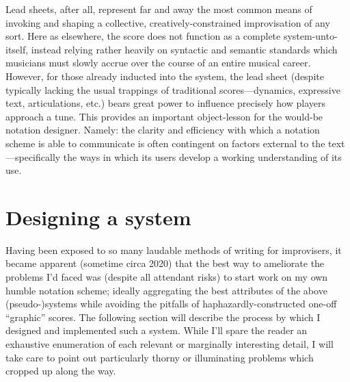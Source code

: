      Lead sheets, after all, represent far and away the most common means of invoking and shaping a collective, creatively-constrained improvisation of any sort. Here as elsewhere, the score does not function as a complete system-unto-itself, instead relying rather heavily on syntactic and semantic standards which musicians must slowly accrue over the course of an entire musical career. However, for those already inducted into the system, the lead sheet (despite typically lacking the usual trappings of traditional scores---dynamics, expressive text, articulations, etc.) bears great power to influence precisely how players approach a tune. This provides an important object-lesson for the would-be notation designer. Namely: the clarity and efficiency with which a notation scheme is able to communicate is often contingent on factors external to the text---specifically the ways in which its users develop a working understanding of its use.

\section{Designing a system}

    Having been exposed to so many laudable methods of writing for improvisers, it became apparent (sometime circa 2020) that the best way to ameliorate the problems I'd faced was (despite all attendant risks) to start work on my own humble notation scheme; ideally aggregating the best attributes of the above (pseudo-)systems while avoiding the pitfalls of haphazardly-constructed one-off ``graphic'' scores. The following section will describe the process by which I designed and implemented such a system. While I'll spare the reader an exhaustive enumeration of each relevant or marginally interesting detail, I will take care to point out particularly thorny or illuminating problems which cropped up along the way.

